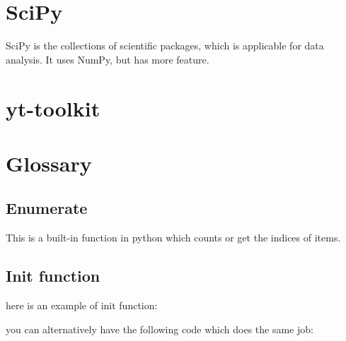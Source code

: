 \documentclass[10pt,a4paper]{article}
\begin{document}




\section{SciPy}

SciPy is the collections of scientific packages, which is applicable for data analysis. It uses NumPy, but has more feature.




















\section{yt-toolkit}


























\section{Glossary}


\subsection{Enumerate}
\label{enumerate}
This is a built-in function in python which counts or get the indices  of items.



\subsection{Init function}
\label{subsec:init}
here is an example of init function:

you can alternatively have the following code which does the same job:

\end{document}
